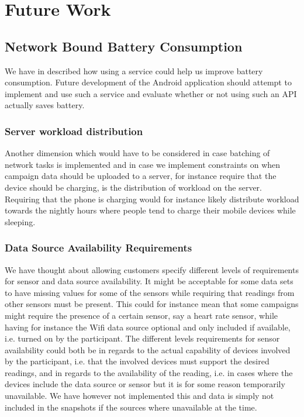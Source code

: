 
\chapter{Future Work}


\section{Network Bound Battery Consumption}
\label{sec:future_work_network_bound_battery_consumption}

We have in  described how using a  service could help us improve battery consumption. Future development of the Android application should attempt to implement and use such a service and evaluate whether or not using such an API actually saves battery.

\subsection{Server workload distribution}

Another dimension which would have to be considered in case batching of network tasks is implemented and in case we implement constraints on when campaign data should be uploaded to a server, for instance require that the device should be charging, is the distribution of workload on the server. Requiring that the phone is charging would for instance likely distribute workload towards the nightly hours where people tend to charge their mobile devices while sleeping.  

\subsection{Data Source Availability Requirements}

We have thought about allowing customers specify different levels of requirements for sensor and data source availability. It might be acceptable for some data sets to have missing values for some of the sensors while requiring that readings from other sensors must be present. This could for instance mean that some campaigns might require the presence of a certain sensor, say a heart rate sensor, while having for instance the Wifi data source optional and only included if available, i.e. turned on by the participant. The different levels requirements for sensor availability could both be in regards to the actual capability of devices involved by the participant, i.e. that the involved devices must support the desired readings, and in regards to the availability of the reading, i.e. in cases where the devices include the data source or sensor but it is for some reason temporarily unavailable. We have however not implemented this and data is simply not included in the snapshots if the sources where unavailable at the time.

